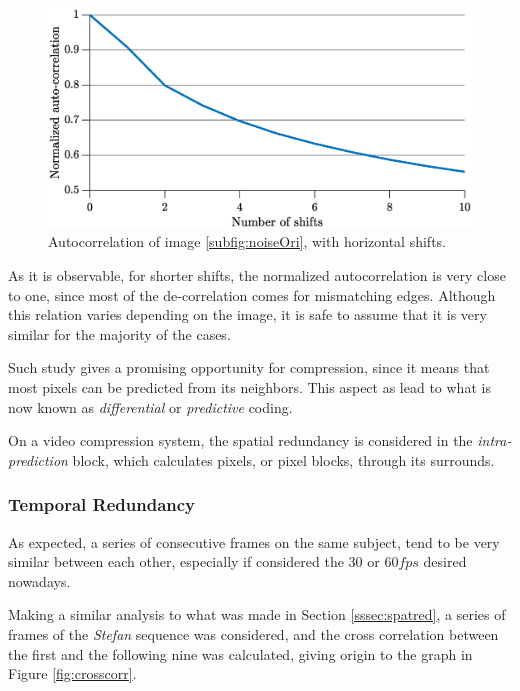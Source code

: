 \begin{figure}[h]
    \centering
    \includegraphics[width=\textwidth]{Sections/2AV1/Diagrams/intracorr.eps}
    \caption{Autocorrelation of image \ref{subfig:noiseOri}, with horizontal shifts.}
    \label{fig:autocorr}
\end{figure}

As it is observable, for shorter shifts, the normalized autocorrelation is very close to one, since most of the de-correlation comes for mismatching edges. Although this relation varies depending on the image, it is safe to assume that it is very similar for the majority of the cases.

Such study gives a promising opportunity for compression, since it means that most pixels can be predicted from its neighbors. This aspect as lead to what is now known as \emph{differential} or \emph{predictive} coding.

On a video compression system, the spatial redundancy is considered in the \emph{intra-prediction} block, which calculates pixels, or pixel blocks, through its surrounds.

\subsubsection{Temporal Redundancy}

As expected, a series of consecutive frames on the same subject, tend to be very similar between each other, especially if considered the $30$ or $60 fps$ desired nowadays. 

Making a similar analysis to what was made in Section \ref{sssec:spatred}, a series of frames of the \emph{Stefan} sequence \cite{YUVSequences} was considered, and the cross correlation between the first and the following nine was calculated, giving origin to the graph in Figure \ref{fig:crosscorr}.

